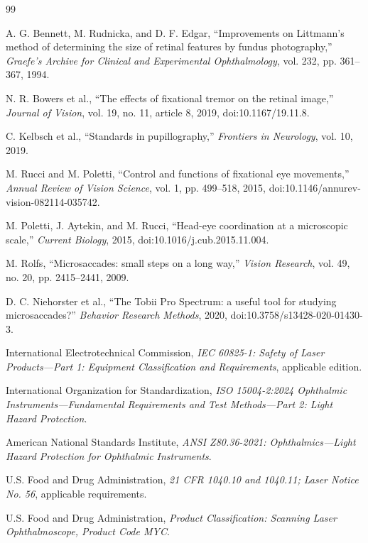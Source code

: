 \documentclass[11pt]{article}
\begin{document}
\begin{thebibliography}{99}

A. G. Bennett, M. Rudnicka, and D. F. Edgar,
``Improvements on Littmann's method of determining the size of retinal features by fundus
photography,'' \emph{Graefe's Archive for Clinical and Experimental Ophthalmology},
vol. 232, pp. 361--367, 1994.

N. R. Bowers et al.,
``The effects of fixational tremor on the retinal image,''
\emph{Journal of Vision}, vol. 19, no. 11, article 8, 2019,
doi:10.1167/19.11.8.

C. Kelbsch et al.,
``Standards in pupillography,''
\emph{Frontiers in Neurology}, vol. 10, 2019.

M. Rucci and M. Poletti,
``Control and functions of fixational eye movements,''
\emph{Annual Review of Vision Science}, vol. 1, pp. 499--518, 2015,
doi:10.1146/annurev-vision-082114-035742.

M. Poletti, J. Aytekin, and M. Rucci,
``Head-eye coordination at a microscopic scale,''
\emph{Current Biology}, 2015,
doi:10.1016/j.cub.2015.11.004.

M. Rolfs,
``Microsaccades: small steps on a long way,''
\emph{Vision Research}, vol. 49, no. 20, pp. 2415--2441, 2009.

D. C. Niehorster et al.,
``The Tobii Pro Spectrum: a useful tool for studying microsaccades?''
\emph{Behavior Research Methods}, 2020,
doi:10.3758/s13428-020-01430-3.

International Electrotechnical Commission,
\emph{IEC 60825-1: Safety of Laser Products---Part 1: Equipment Classification and Requirements},
applicable edition.

International Organization for Standardization,
\emph{ISO 15004-2:2024 Ophthalmic Instruments---Fundamental Requirements and Test Methods---Part 2:
Light Hazard Protection}.

American National Standards Institute,
\emph{ANSI Z80.36-2021: Ophthalmics---Light Hazard Protection for Ophthalmic Instruments}.

U.S. Food and Drug Administration,
\emph{21 CFR 1040.10 and 1040.11; Laser Notice No. 56}, applicable requirements.

U.S. Food and Drug Administration,
\emph{Product Classification: Scanning Laser Ophthalmoscope, Product Code MYC}.

\end{thebibliography}
\end{document}
